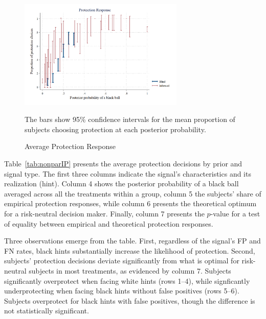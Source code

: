 \documentclass[12pt,a4paper]{article}
\newcommand{\fnote}[1]{\captionsetup{font={small, it}, aboveskip=0pt} \caption*{#1}}
\begin{document}

\begin{figure}[H]
\centering
\caption{Average Protection Response} \label{fig:ProtResponse}
  \includegraphics[width=0.7\textwidth]{Graphs/ip_response_comp.png}
\fnote{The bars show 95\% confidence intervals for the mean proportion of subjects choosing protection at each posterior probability.}
\end{figure}

Table~\ref{tab:nonparIP} presents the average protection decisions by prior and signal type. The first three columns indicate the signal's characteristics and its realization (hint). Column 4 shows the posterior probability of a black ball averaged across all the treatments within a group, column 5 the subjects' share of empirical protection responses, while column 6 presents the theoretical optimum for a risk-neutral decision maker. Finally, column 7 presents the $p$-value for a test of equality between empirical and theoretical protection responses.

Three observations emerge from the table. First, regardless of the signal's FP and FN rates, black hints substantially increase the likelihood of protection.  Second, subjects' protection decisions deviate significantly from what is optimal for risk-neutral subjects in most treatments, as evidenced by column 7. Subjects significantly overprotect when facing white hints (rows 1--4), while signficantly underprotecting when facing black hints without false positives (rows 5--6).  Subjects overprotect for black hints with false positives, though the difference is not statistically significant. 
\end{document}
